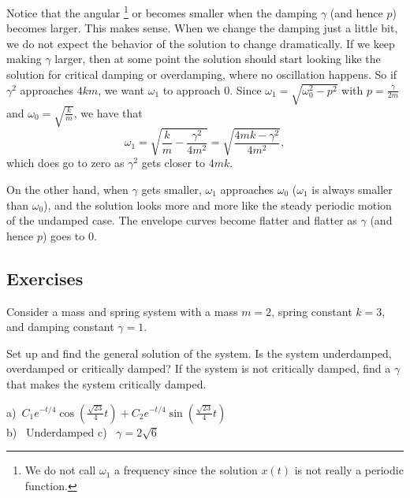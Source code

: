 Notice that the angular
\emph{}\footnote{We do not call $\omega_1$ a frequency
since the solution $x(t)$ is not really a periodic function.} or \emph{} becomes
smaller when the damping $\gamma$ (and hence $p$) becomes larger.  This makes sense.
When we change the damping just a little bit, we do not
expect the behavior of the solution to change dramatically.
If we keep making $\gamma$ larger, then
at some point the solution should start looking 
like the solution for critical damping or overdamping, where no oscillation
happens.  So if $\gamma^2$ approaches $4km$, we want $\omega_1$ to approach 0. Since $\omega_1 = \sqrt{\omega_0^2 - p^2}$ with $p = \frac{\gamma}{2m}$ and $\omega_0 = \sqrt{\frac{k}{m}}$, we have that
\begin{equation*}
\omega_1 = \sqrt{\frac{k}{m} - \frac{\gamma^2}{4m^2}} = \sqrt{\frac{4mk - \gamma^2}{4m^2}},
\end{equation*}
which does go to zero as $\gamma^2$ gets closer to $4mk$. 


On the other hand, when $\gamma$ gets smaller, $\omega_1$ approaches $\omega_0$
($\omega_1$ is always smaller than $\omega_0$), and the solution looks more and more like the steady
periodic motion of the undamped case.  The envelope curves become flatter and
flatter as $\gamma$ (and hence $p$) goes to 0.

\subsection{Exercises}

\begin{samepage}
\begin{exercise} \label{mv:ex1}
Consider a mass and spring system with a mass $m=2$, spring constant $k=3$, and
damping constant $\gamma=1$.
\begin{tasks}
\task Set up and find the general solution of the system.
\task Is the system underdamped, overdamped or critically damped?
\task If the system is not critically damped, find a $\gamma$ that makes the system
critically damped.
\end{tasks}
\end{exercise}
\end{samepage}
\comboSol{%
}
{%
a)~$C_1e^{-t/4}\cos\left(\frac{\sqrt{23}}{4}t\right) + C_2e^{-t/4}\sin\left(\frac{\sqrt{23}}{4}t\right)$ \\
b)~ Underdamped \quad c)~ $\gamma = 2\sqrt{6}$
}

